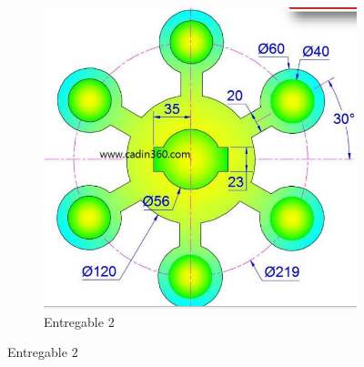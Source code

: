 \documentclass[letterpaper,pdftex]{article}
\begin{document}
\begin{figure}[h]
\begin{subfigure}[b]{0.45\textwidth}
         \includegraphics[width=\textwidth]{task2}
         \caption{Entregable 2}
         \label{fig:der2}
     \end{subfigure}
\end{figure}
%
\end{document}
